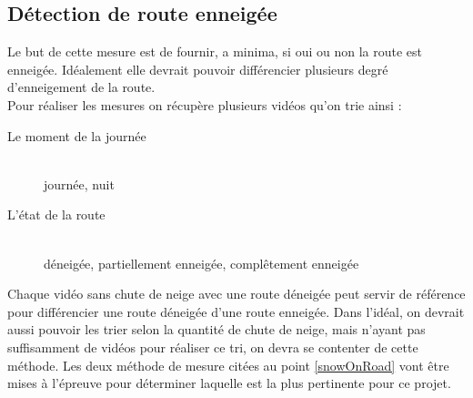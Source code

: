 \subsection{Détection de route enneigée}
Le but de cette mesure est de fournir, a minima, si oui ou non la route
est enneigée. Idéalement elle devrait pouvoir différencier plusieurs degré
d'enneigement de la route. \\
Pour réaliser les mesures on récupère plusieurs vidéos qu'on trie ainsi :
\begin{description}
    \item[Le moment de la journée] \hfill \\
    journée, nuit 
    \item[L'état de la route] \hfill \\
    déneigée, partiellement enneigée, complêtement enneigée 
\end{description}
Chaque vidéo sans chute de neige avec une route déneigée peut servir de 
référence pour différencier une route déneigée d'une route enneigée.
Dans l'idéal, on devrait aussi pouvoir les trier selon la quantité de chute
de neige, mais n'ayant pas suffisamment de vidéos pour réaliser ce tri, on devra
se contenter de cette méthode.
Les deux méthode de mesure citées au point \ref{snowOnRoad} vont être mises
à l'épreuve pour déterminer laquelle est la plus pertinente pour ce projet.

